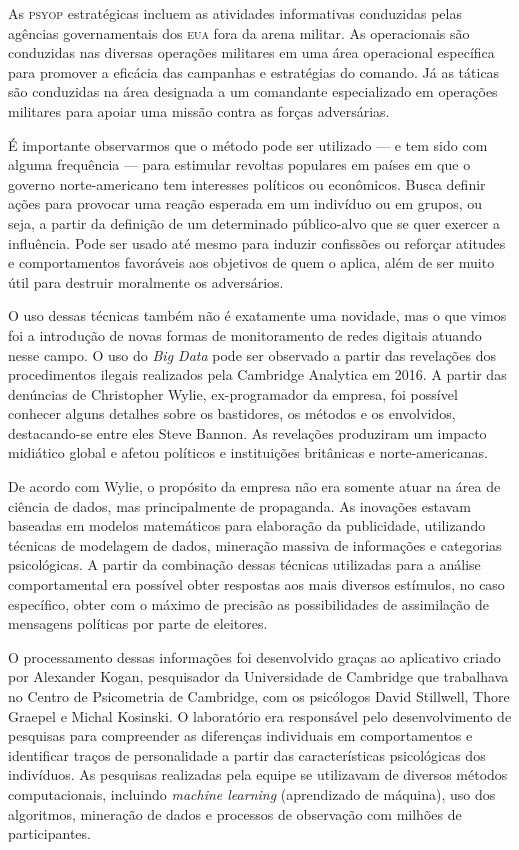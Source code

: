 As \textsc{psyop} estratégicas incluem as atividades informativas conduzidas
pelas agências governamentais dos \textsc{eua} fora da arena militar. As
operacionais são conduzidas nas diversas operações militares em uma área
operacional específica para promover a eficácia das campanhas e
estratégias do comando. Já as táticas são conduzidas na área designada a
um comandante especializado em operações militares para apoiar uma
missão contra as forças adversárias.

É importante observarmos que o método pode ser utilizado --- e tem sido
com alguma frequência --- para estimular revoltas populares em países em
que o governo norte-americano tem interesses políticos ou econômicos. Busca
definir ações para provocar uma reação esperada em um indivíduo ou em
grupos, ou seja, a partir da definição de um determinado público-alvo
que se quer exercer a influência. Pode ser usado até mesmo para induzir
confissões ou reforçar atitudes e comportamentos favoráveis aos
objetivos de quem o aplica, além de ser muito útil para destruir
moralmente os adversários.

O uso dessas técnicas também não é exatamente uma novidade, mas o que
vimos foi a introdução de novas formas de monitoramento de redes
digitais atuando nesse campo. O uso do \textit{Big Data} pode ser observado a
partir das revelações dos procedimentos ilegais realizados pela
Cambridge Analytica em 2016. A partir das denúncias de Christopher
Wylie, ex-programador da empresa, foi possível conhecer alguns detalhes
sobre os bastidores, os métodos e os envolvidos, destacando-se entre
eles Steve Bannon. As revelações produziram um impacto midiático global
e afetou políticos e instituições britânicas e norte-americanas.

De acordo com Wylie, o propósito da empresa não era somente atuar na
área de ciência de dados, mas principalmente de propaganda. As inovações
estavam baseadas em modelos matemáticos para elaboração da publicidade,
utilizando técnicas de modelagem de dados, mineração massiva de
informações e categorias psicológicas. A partir da combinação dessas
técnicas utilizadas para a análise comportamental era possível obter
respostas aos mais diversos estímulos, no caso específico, obter com o
máximo de precisão as possibilidades de assimilação de mensagens
políticas por parte de eleitores.

O processamento dessas informações foi desenvolvido graças ao aplicativo
criado por Alexander Kogan, pesquisador da Universidade de Cambridge que
trabalhava no Centro de Psicometria de Cambridge, com os psicólogos
David Stillwell, Thore Graepel e Michal Kosinski. O laboratório era
responsável pelo desenvolvimento de pesquisas para compreender as
diferenças individuais em comportamentos e identificar traços de
personalidade a partir das características psicológicas dos indivíduos.
As pesquisas realizadas pela equipe se utilizavam de diversos métodos
computacionais, incluindo \textit{machine learning} (aprendizado de máquina), uso
dos algoritmos, mineração de dados e processos de observação com milhões
de participantes.

